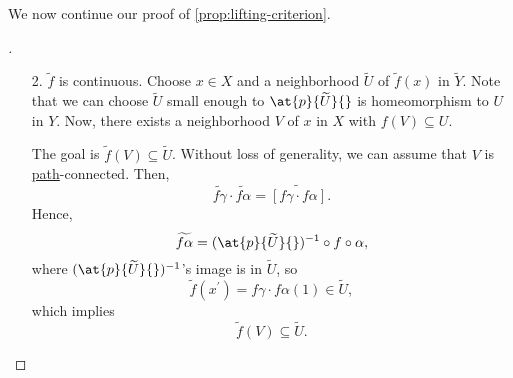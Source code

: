 We now continue our proof of \autoref{prop:lifting-criterion}.
\begin{proof}[\unskip\nopunct]
	\begin{enumerate}[(a)]
		\item[2.] \(\widetilde{f} \) is continuous. Choose \(x\in X\) and a neighborhood \(\widetilde{U} \) of \(\widetilde{f} (x)\) in \(\widetilde{Y} \). Note that we can choose \(\widetilde{U} \) small enough to \(\at{p}{\widetilde{U} }{} \) is homeomorphism to \(U\) in \(Y\). Now, there exists a neighborhood \(V\) of \(x\) in \(X\) with \(f(V)\subseteq U\).
		      \begin{figure}[H]
			      \centering
			      \label{fig:pf:prop:lifting-criterion-2}
		      \end{figure}
		      The goal is \(\widetilde{f} (V)\subseteq \widetilde{U}\). Without loss of generality, we can assume that \(V\) is \hyperref[def:path]{path}-connected. Then,
		      \[
			      \widetilde{f \gamma } \cdot \widetilde{f \alpha } = \widetilde{\left[f \gamma \cdot f \alpha \right]}.
		      \]
		      Hence,
		      \[
			      \widetilde{f \alpha } = (\at{p}{\widetilde{U} }{})^{-1} \circ f\circ \alpha,
		      \]
		      where \((\at{p}{\widetilde{U} }{})^{-1}\)'s image is in \(\widetilde{U} \), so
		      \[
			      \widetilde{f} (x ^\prime ) = f \gamma \cdot f \alpha (1)\in \widetilde{U},
		      \]
		      which implies
		      \[
			      \widetilde{f} (V)\subseteq \widetilde{U}.
		      \]
	\end{enumerate}
\end{proof}

